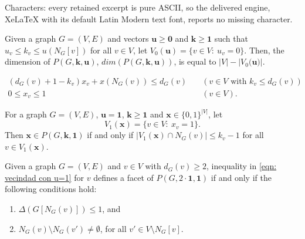 \documentclass[10pt,a4paper]{amsart}
\renewcommand{\geq}{\geqslant}
\renewcommand{\leq}{\leqslant}
\begin{document}
Characters: every retained excerpt is pure ASCII, so the delivered engine, XeLaTeX with its default Latin Modern text font, reports no missing character.
\begin{proposition}\label{prop:dimensionofP}
Given a graph $G=(V,E)$ and vectors $\mathbf{u}\geq \mathbf{0}$ and $\mathbf{k}\geq \mathbf{1}$ such that  $u_v\leq k_v\leq u(N_G[v])$  for all $v\in V$, let  $V_0(\mathbf{u})=\{v\in V:\ u_v=0\}$. Then, the dimension of $P(G,\mathbf{k},\mathbf{u})$, 
$dim(P(G,\mathbf{k},\mathbf{u}))$, is equal to $|V|-|V_0(\mathbf{u)}|$.
\end{proposition}

\begin{align}
(d_G(v)+1 - k_v)x_v + x( N_G(v))  \leq d_G(v) &\quad (v\in V\text{ with } k_v\leq d_G(v) ) \label{eqn: vecindad con u=1} \\ 
0\leq x_v \leq 1 \label{eqn:0,1} &\quad (v\in V).\end{align}

\begin{remark}\label{rem:V1}
   For a graph $G=(V,E)$, $\mathbf{u}=\mathbf{1}$, $\mathbf{k}\geq \mathbf{1}$ and  $\mathbf{x}\in \{0,1\}^{|V|}$, let $$V_1(\mathbf{x})=\{v\in V:\ x_v=1\}.$$ Then $\mathbf{x}\in P(G,\mathbf{k},\mathbf{1})$ if and only if $|V_1(\mathbf{x})\cap N_G(v)|\leq k_v-1$ for all $v\in V_1(\mathbf{x})$.
\end{remark}

\begin{theorem}\label{th:4.7}
    Given a graph $G=(V,E)$ and  $v\in V$ with $d_G(v)\geq 2$, inequality in \eqref{eqn: vecindad con u=1} for $v$ defines a facet of $P(G,2\cdot\mathbf{1},\mathbf{1})$ if and only if the following conditions hold:
    \begin{enumerate}
        \item[i.] $\Delta(G[N_G(v)])\leq 1$, and
        \item[ii.] $N_G(v)\setminus N_G(v')\neq \emptyset$, for all $v'\in V\setminus N_G[v]$.
    \end{enumerate}
    
     
\end{theorem}
\end{document}
